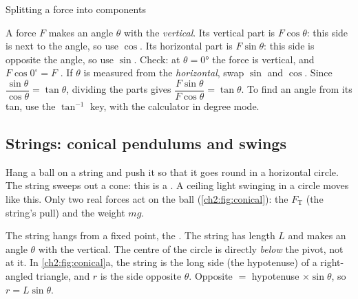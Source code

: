 \begin{toolkit}{Splitting a force into components}
\begin{sidebyside}[0.72]
A force $F$ makes an angle $\theta$ with the \emph{vertical}. Its vertical part is
$F\cos\theta$: this side is next to the angle, so use $\cos$. Its horizontal part is
$F\sin\theta$: this side is opposite the angle, so use $\sin$. Check: at $\theta = \ang{0}$
the force is vertical, and $F\cos 0^\circ = F$ \cmark. If $\theta$ is measured from the
\emph{horizontal}, swap $\sin$ and $\cos$. Since $\dfrac{\sin\theta}{\cos\theta} = \tan\theta$,
dividing the parts gives $\dfrac{F\sin\theta}{F\cos\theta} = \tan\theta$. To find an angle
from its tan, use the $\tan^{-1}$ key, with the calculator in degree mode.
\nextside
  \centering
\end{sidebyside}
\end{toolkit}

\subsection*{Strings: conical pendulums and swings}
Hang a ball on a string and push it so that it goes round in a horizontal circle. The
string sweeps out a cone: this is a . A ceiling light swinging in a
circle moves like this. Only two real forces act on the ball (\cref{ch2:fig:conical}): the
 $F_\mathrm{T}$ (the string's pull) and the weight $mg$.

The string hangs from a fixed point, the . The string has length $L$ and makes an
angle $\theta$ with the vertical. The centre of the circle is directly \emph{below} the
pivot, not at it. In \cref{ch2:fig:conical}a, the string is the long side (the hypotenuse) of
a right-angled triangle, and $r$ is the side opposite $\theta$. Opposite $=$ hypotenuse
$\times \sin\theta$, so $r = L\sin\theta$.

